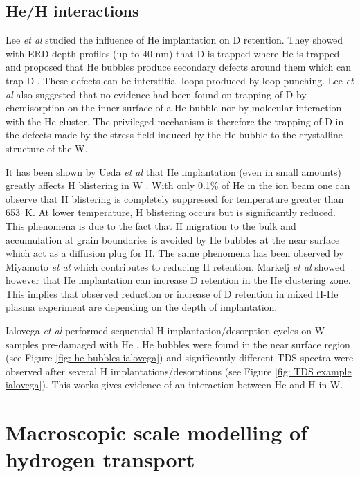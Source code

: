\subsection{He/H interactions}
Lee \textit{et al} studied the influence of He implantation on D retention.
They showed with ERD depth profiles (up to 40 nm) that D is trapped where He is trapped and proposed that He bubbles produce secondary defects around them which can trap D .
These defects can be interstitial loops produced by loop punching.
Lee \textit{et al} also suggested that no evidence had been found on trapping of D by chemisorption on the inner surface of a He bubble nor by molecular interaction with the He cluster.
The privileged mechanism is therefore the trapping of D in the defects made by the stress field induced by the He bubble to the crystalline structure of the W.

It has been shown by Ueda \textit{et al} that He implantation (even in small amounts) greatly affects H blistering in W .
With only 0.1\% of He in the ion beam one can observe that H blistering is completely suppressed for temperature greater than \SI{653}{K}.
At lower temperature, H blistering occurs but is significantly reduced.
This phenomena is due to the fact that H migration to the bulk and accumulation at grain boundaries is avoided by He bubbles at the near surface which act as a diffusion plug for H.
The same phenomena has been observed by Miyamoto \textit{et al}  which contributes to reducing H retention.
Markelj \textit{et al}  showed however that He implantation can increase D retention in the He clustering zone.
This implies that observed reduction or increase of D retention in mixed H-He plasma experiment are depending on the depth of implantation.

Ialovega \textit{et al} performed sequential H implantation/desorption cycles on W samples pre-damaged with He .
He bubbles were found in the near surface region (see Figure \ref{fig: he bubbles ialovega}) and significantly different TDS spectra were observed after several H implantations/desorptions (see Figure \ref{fig: TDS example ialovega}).
This works gives evidence of an interaction between He and H in W.

\section{Macroscopic scale modelling of hydrogen transport}

